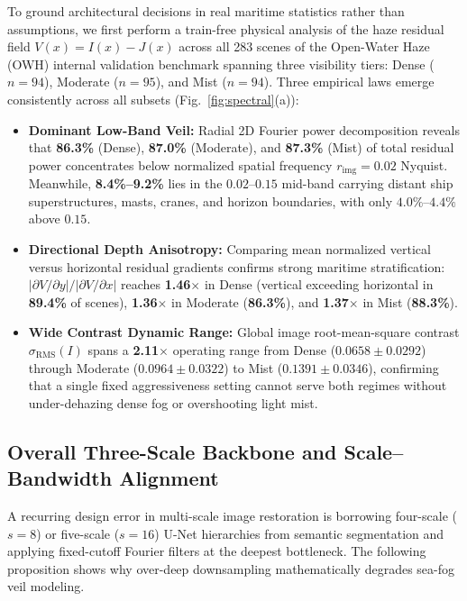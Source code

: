 \documentclass[journal,twoside]{IEEEtran}
\begin{document}
To ground architectural decisions in real maritime statistics rather than assumptions, we first perform a train-free physical analysis of the haze residual field $V(x)=I(x)-J(x)$ across all 283 scenes of the Open-Water Haze (OWH) internal validation benchmark spanning three visibility tiers: Dense ($n=94$), Moderate ($n=95$), and Mist ($n=94$). Three empirical laws emerge consistently across all subsets (Fig.~\ref{fig:spectral}(a)):
\begin{itemize}
    \item \textbf{Dominant Low-Band Veil:} Radial 2D Fourier power decomposition reveals that \textbf{86.3\%} (Dense), \textbf{87.0\%} (Moderate), and \textbf{87.3\%} (Mist) of total residual power concentrates below normalized spatial frequency $r_{\mathrm{img}} = 0.02$ Nyquist. Meanwhile, \textbf{8.4\%--9.2\%} lies in the $0.02\text{--}0.15$ mid-band carrying distant ship superstructures, masts, cranes, and horizon boundaries, with only $4.0\%\text{--}4.4\%$ above $0.15$.
    \item \textbf{Directional Depth Anisotropy:} Comparing mean normalized vertical versus horizontal residual gradients confirms strong maritime stratification: $|\partial V/\partial y| / |\partial V/\partial x|$ reaches \textbf{1.46$\times$} in Dense (vertical exceeding horizontal in \textbf{89.4\%} of scenes), \textbf{1.36$\times$} in Moderate (\textbf{86.3\%}), and \textbf{1.37$\times$} in Mist (\textbf{88.3\%}).
    \item \textbf{Wide Contrast Dynamic Range:} Global image root-mean-square contrast $\sigma_{\mathrm{RMS}}(I)$ spans a \textbf{2.11$\times$} operating range from Dense ($0.0658 \pm 0.0292$) through Moderate ($0.0964 \pm 0.0322$) to Mist ($0.1391 \pm 0.0346$), confirming that a single fixed aggressiveness setting cannot serve both regimes without under-dehazing dense fog or overshooting light mist.
\end{itemize}

\subsection{Overall Three-Scale Backbone and Scale--Bandwidth Alignment}
\label{sec:backbone}

A recurring design error in multi-scale image restoration is borrowing four-scale ($s=8$) or five-scale ($s=16$) U-Net hierarchies from semantic segmentation and applying fixed-cutoff Fourier filters at the deepest bottleneck. The following proposition shows why over-deep downsampling mathematically degrades sea-fog veil modeling.
\end{document}
